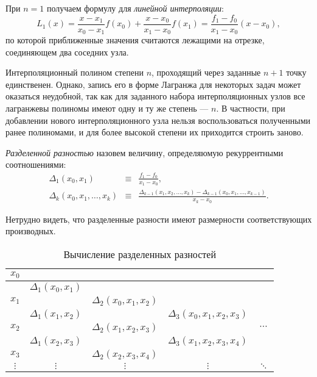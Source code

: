 При $n=1$ получаем формулу для \emph{линейной интерполяции}:
\[
L_{1}(x)=\frac{x-x_{1}}{x_{0}-x_{1}}f(x_{0})+\frac{x-x_{0}}{x_{1}-x_{0}}f(x_{1})=\frac{f_{1}-f_{0}}{x_{1}-x_{0}}(x-x_{0}),
\]
по которой приближенные значения считаются лежащими на отрезке,
соединяющем два соседних узла.


Интерполяционный полином степени $n$, проходящий через заданные $n+1$
точку единственен. Однако, запись его в форме Лагранжа для некоторых
задач может оказаться неудобной, так как для заданного набора
интерполяционных узлов все лагранжевы полиномы имеют одну и ту же
степень --- $n$.  В частности, при добавлении нового интерполяционного
узла нельзя воспользоваться полученными ранее полиномами, и для более
высокой степени их приходится строить заново.

\emph{Разделенной разностью} назовем
величину, определяюмую рекуррентными соотношениями:
\begin{eqnarray*}
\Delta_{1}(x_{0},x_{1}) & \equiv & \frac{f_{1}-f_{0}}{x_{1}-x_{0}},\\
\Delta_{k}(x_{0},x_{1},\dots,x_{k}) & \equiv & \frac{\Delta_{k-1}(x_{1},x_{2},\dots,x_{k})-\Delta_{k-1}(x_{0},x_{1},\dots,x_{k-1})}{x_{k}-x_{0}}.
\end{eqnarray*}


Нетрудно видеть, что разделенные разности имеют размерности
соответствующих производных.
\begin{table}
\noindent \begin{centering}
\begin{tabular}{|c|c|c|c|c|}
\hline 
$x_{0}$ &  &  &  & \tabularnewline
\hline 
 & $\Delta_{1}(x_{0},x_{1})$ &  &  & \tabularnewline
\hline 
$x_{1}$ &  & $\Delta_{2}(x_{0},x_{1},x_{2})$ &  & \tabularnewline
\hline 
 & $\Delta_{1}(x_{1},x_{2})$ &  & $\Delta_{3}(x_{0},x_{1},x_{2},x_{3})$ & \tabularnewline
\hline 
$x_{2}$ &  & $\Delta_{2}(x_{1},x_{2},x_{3})$ &  & $\cdots$\tabularnewline
\hline 
 & $\Delta_{1}(x_{2},x_{3})$ &  & $\Delta_{3}(x_{1},x_{2},x_{3},x_{4})$ & \tabularnewline
\hline 
$x_{3}$ &  & $\Delta_{2}(x_{2},x_{3},x_{4})$ &  & \tabularnewline
\hline 
$\vdots$ & $\vdots$ & $\vdots$ & $\vdots$ & $\ddots$\tabularnewline
\hline 
\end{tabular}
\par\end{centering}

\caption{Вычисление разделенных разностей}
\label{tab:divdiff}
\end{table}

